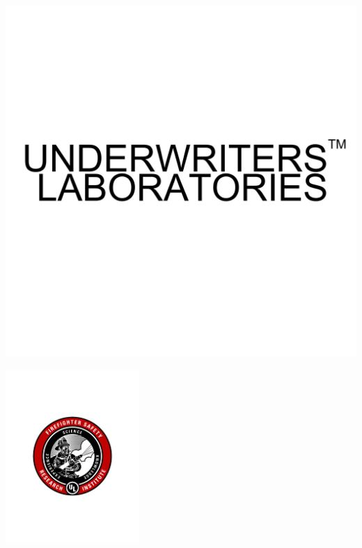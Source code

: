 \documentclass[12pt,oneside]{book}
\begin{document}

	
\begin{minipage}[t][9in][s]{6.25in}


\normalsize
{}
	\vfill

\begin{flushright}
\begin{minipage}{0.5\textwidth}
\includegraphics[width=\textwidth]{UnderwritersLaboratories_TM} \\ 
\end{minipage} \hfill
\begin{minipage}{0.25\textwidth}
\includegraphics[width=2.0in]{FSRI_GraphicShield} \\ 
\end{minipage}
\end{flushright}


\end{minipage}
\end{document}
